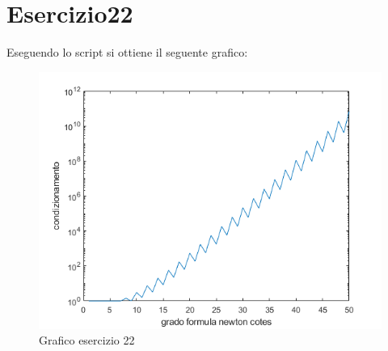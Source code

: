 \section{Esercizio22}

Eseguendo lo script si ottiene il seguente grafico:
\begin{figure}[h]
    \includegraphics[scale=0.8]{CodiceMatlab/Esercizio21-23/graficoEs22.png}
    \caption{Grafico esercizio 22}
    \label{fig:es16}    
\end{figure}